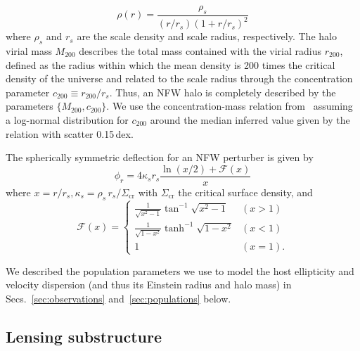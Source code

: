 \documentclass[twocolumn]{aastex62}
\begin{document}
\begin{equation}
\rho(r)=\frac{\rho_{s}}{\left(r / r_{s}\right)\left(1+r / r_{s}\right)^{2}}
\end{equation}
where $\rho_s$ and $r_s$ are the scale density and scale radius, respectively. The halo virial mass $M_{200}$ describes the total mass contained with the virial radius $r_{200}$, defined as the radius within which the mean density is 200 times the critical density of the universe and related to the scale radius through the concentration parameter $c_{200} \equiv r_{200}/r_s$. Thus, an NFW halo is completely described by the parameters $\{M_{200}, c_{200}\}$. We use the concentration-mass relation from~\citet{2014MNRAS.442.2271S} assuming a log-normal distribution for $c_{200}$ around the median inferred value given by the relation with scatter 0.15\,dex.

The spherically symmetric deflection for an NFW perturber is given by
\begin{equation}
\phi_{r}=4 \kappa_{s} r_{s} \frac{\ln (x / 2)+\mathcal{F}(x)}{x}
\end{equation}
where $x = r/r_s, \kappa_s = \rho_s\,r_s/\Sigma_\mathrm{cr}$ with $\Sigma_\mathrm{cr}$ the critical surface density, and
\begin{equation}
\mathcal{F}(x)=\left\{\begin{array}{ll}{\frac{1}{\sqrt{x^{2}-1}} \tan ^{-1} \sqrt{x^{2}-1}} & {(x>1)} \\ {\frac{1}{\sqrt{1-x^{2}}} \tanh ^{-1} \sqrt{1-x^{2}}} & {(x<1)} \\ {1} & {(x=1).}\end{array}\right.
\label{eq:Fx}
\end{equation}

We described the population parameters we use to model the host ellipticity and velocity dispersion (and thus its Einstein radius and halo mass) in Secs.~\ref{sec:observations} and~\ref{sec:populations} below.


\subsection{Lensing substructure}
\end{document}
